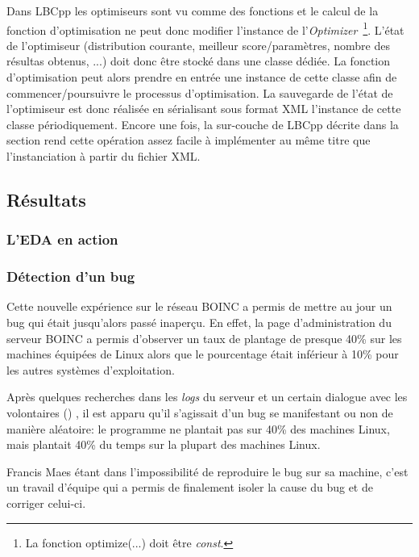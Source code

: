 \documentclass[a4paper, 11pt]{report}
\begin{document}
Dans LBCpp les optimiseurs sont vu comme des fonctions et le calcul de la fonction d'optimisation ne peut donc modifier l'instance de l'\textit{Optimizer}~\footnote{La fonction optimize(...) doit être \textit{const}.}. %
L'état de l'optimiseur (distribution courante, meilleur score/paramètres, nombre des résultas obtenus, ...) doit donc être stocké dans une classe dédiée. La fonction d'optimisation peut alors prendre en entrée une instance de cette classe afin de commencer/poursuivre le processus d'optimisation. La sauvegarde de l'état de l'optimiseur est donc réalisée en sérialisant sous format XML l'instance de cette classe périodiquement. Encore une fois, la sur-couche de LBCpp décrite dans la section %
rend cette opération assez facile à implémenter au même titre que l'instanciation à partir du fichier XML.

\subsection{Résultats}

\subsubsection{L'EDA en action}

\subsubsection{Détection d'un bug}
Cette nouvelle expérience sur le réseau \textsc{BOINC} a permis de mettre au jour un bug qui était jusqu'alors passé inaperçu. En effet, la page d'administration du serveur \textsc{BOINC} a permis d'observer un taux de plantage de presque 40\% sur les machines équipées de Linux alors que le pourcentage était inférieur à 10\% pour les autres systèmes d'exploitation.

Après quelques recherches dans les \textit{logs} du serveur et un certain dialogue avec les volontaires ()%
, il est apparu qu'il s'agissait d'un bug se manifestant ou non de manière aléatoire: le programme ne plantait pas sur 40\% des machines Linux, mais plantait 40\% du temps sur la plupart des machines Linux.

Francis Maes étant dans l'impossibilité de reproduire le bug sur sa machine, c'est un travail d'équipe qui a permis de finalement isoler la cause du bug et de corriger celui-ci. %
\end{document}
